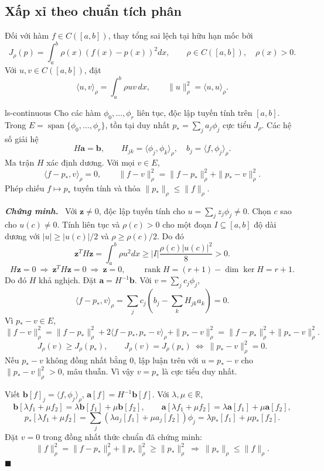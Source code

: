 \documentclass[12pt,a4paper,oneside]{book}
\numberwithin{algorithm}{chapter}
\theoremstyle{definition}
\newenvironment{chungminh}{\par\medskip\noindent\textbf{\textit{\color{mainblue}Chứng minh.}}\ }{\hfill$\blacksquare$\par\medskip}
\newcommand{\R}{\mathbb{R}}
\begin{document}
\subsection{Xấp xỉ theo chuẩn tích phân}
Đối với hàm $f\in C([a,b])$, thay tổng sai lệch tại hữu hạn mốc bởi
\[
 J_\rho(p)=\int_a^b\rho(x)(f(x)-p(x))^2dx,
 \qquad\rho\in C([a,b]),\quad\rho(x)>0.
\]
Với $u,v\in C([a,b])$, đặt
\[
 \langle u,v\rangle_\rho=\int_a^b\rho uv\,dx,\qquad\|u\|_\rho^2=\langle u,u\rangle_\rho.
\]
\begin{dinhly}{}{ls-continuous}
Cho các hàm $\phi_0,\ldots,\phi_r$ liên tục, độc lập tuyến tính trên $[a,b]$. Trong $E=\operatorname{span}\{\phi_0,\ldots,\phi_r\}$, tồn tại duy nhất $p_*=\sum_ja_j\phi_j$ cực tiểu $J_\rho$. Các hệ số giải hệ
\begin{equation}\label{eq:ls-continuous-normal}
 H\mathbf a=\mathbf b,\qquad
 H_{jk}=\langle\phi_j,\phi_k\rangle_\rho,\quad b_j=\langle f,\phi_j\rangle_\rho.
\end{equation}
Ma trận $H$ xác định dương. Với mọi $v\in E$,
\[
 \langle f-p_*,v\rangle_\rho=0,\qquad
 \|f-v\|_\rho^2=\|f-p_*\|_\rho^2+\|p_*-v\|_\rho^2.
\]
Phép chiếu $f\mapsto p_*$ tuyến tính và thỏa $\|p_*\|_\rho\leq\|f\|_\rho$.
\end{dinhly}
\begin{chungminh}
Với $\mathbf z\ne0$, độc lập tuyến tính cho $u=\sum_jz_j\phi_j\ne0$. Chọn $c$ sao cho $u(c)\ne0$. Tính liên tục và $\rho(c)>0$ cho một đoạn $I\subseteq[a,b]$ độ dài dương với $|u|\geq|u(c)|/2$ và $\rho\geq\rho(c)/2$. Do đó
\[
 \mathbf z^TH\mathbf z=\int_a^b\rho u^2dx\geq|I|\frac{\rho(c)|u(c)|^2}8>0.
\]
\[
 H\mathbf z=0\ \Longrightarrow\
 \mathbf z^TH\mathbf z=0\ \Longrightarrow\ \mathbf z=0,
 \qquad \operatorname{rank}H=(r+1)-\dim\ker H=r+1.
\]
Do đó $H$ khả nghịch. Đặt $\mathbf a=H^{-1}\mathbf b$. Với $v=\sum_jc_j\phi_j$,
\[
 \langle f-p_*,v\rangle_\rho
 =\sum_jc_j\left(b_j-\sum_kH_{jk}a_k\right)=0.
\]
Vì $p_*-v\in E$,
\[
 \|f-v\|_\rho^2
 =\|f-p_*\|_\rho^2+2\langle f-p_*,p_*-v\rangle_\rho+\|p_*-v\|_\rho^2
 =\|f-p_*\|_\rho^2+\|p_*-v\|_\rho^2.
\]
\[
 J_\rho(v)\geq J_\rho(p_*),\qquad
 J_\rho(v)=J_\rho(p_*)
 \ \Longleftrightarrow\ \|p_*-v\|_\rho^2=0.
\]
Nếu $p_*-v$ không đồng nhất bằng $0$, lập luận trên với $u=p_*-v$ cho $\|p_*-v\|_\rho^2>0$, mâu thuẫn. Vì vậy $v=p_*$ là cực tiểu duy nhất.

Viết $\mathbf b[f]_j=\langle f,\phi_j\rangle_\rho$, $\mathbf a[f]=H^{-1}\mathbf b[f]$. Với $\lambda,\mu\in\R$,
\[
 \mathbf b[\lambda f_1+\mu f_2]
 =\lambda\mathbf b[f_1]+\mu\mathbf b[f_2],\qquad
 \mathbf a[\lambda f_1+\mu f_2]
 =\lambda\mathbf a[f_1]+\mu\mathbf a[f_2],
\]
\[
 p_*[\lambda f_1+\mu f_2]
 =\sum_j(\lambda a_j[f_1]+\mu a_j[f_2])\phi_j
 =\lambda p_*[f_1]+\mu p_*[f_2].
\]
Đặt $v=0$ trong đồng nhất thức chuẩn đã chứng minh:
\[
 \|f\|_\rho^2=\|f-p_*\|_\rho^2+\|p_*\|_\rho^2
 \geq\|p_*\|_\rho^2
 \ \Longrightarrow\ \|p_*\|_\rho\leq\|f\|_\rho.
\]
\end{chungminh}
\end{document}
